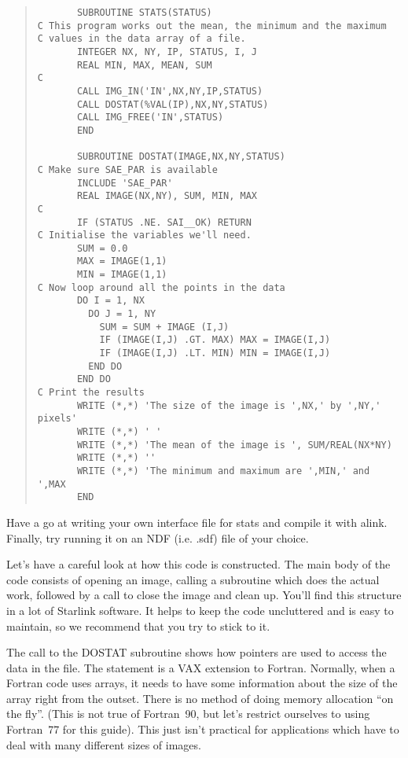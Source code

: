 \begin{quote}
{\small
\begin{verbatim}
       SUBROUTINE STATS(STATUS)
C This program works out the mean, the minimum and the maximum
C values in the data array of a file.
       INTEGER NX, NY, IP, STATUS, I, J
       REAL MIN, MAX, MEAN, SUM
C       
       CALL IMG_IN('IN',NX,NY,IP,STATUS)
       CALL DOSTAT(%VAL(IP),NX,NY,STATUS)
       CALL IMG_FREE('IN',STATUS)
       END

       SUBROUTINE DOSTAT(IMAGE,NX,NY,STATUS)
C Make sure SAE_PAR is available
       INCLUDE 'SAE_PAR'
       REAL IMAGE(NX,NY), SUM, MIN, MAX
C
       IF (STATUS .NE. SAI__OK) RETURN
C Initialise the variables we'll need.
       SUM = 0.0
       MAX = IMAGE(1,1)
       MIN = IMAGE(1,1)
C Now loop around all the points in the data
       DO I = 1, NX
         DO J = 1, NY
           SUM = SUM + IMAGE (I,J)
           IF (IMAGE(I,J) .GT. MAX) MAX = IMAGE(I,J)
           IF (IMAGE(I,J) .LT. MIN) MIN = IMAGE(I,J)
         END DO
       END DO
C Print the results
       WRITE (*,*) 'The size of the image is ',NX,' by ',NY,' pixels'
       WRITE (*,*) ' '
       WRITE (*,*) 'The mean of the image is ', SUM/REAL(NX*NY) 
       WRITE (*,*) ''
       WRITE (*,*) 'The minimum and maximum are ',MIN,' and ',MAX
       END
\end{verbatim}
}
\end{quote}

Have a go at writing your own interface file for {\sf stats} and
compile it with {\sf alink}. Finally, try running it on an
NDF (i.e. .sdf) file of your choice.

Let's have a careful look at how this code is constructed. The main body
of the code consists of opening an image, calling a subroutine which does the
actual work, followed by a call to close the image and clean up. You'll
find this structure in a lot of Starlink software. It helps to keep the 
code uncluttered and is easy to maintain, so we recommend that
you try to stick to it.

The call to the {\sf DOSTAT} subroutine shows how pointers are used to
access the data in the file. The {} statement is a VAX
extension to Fortran.  Normally, when a Fortran code uses arrays, it needs
to have some information about the size of the array right from the outset.
There is no method of doing memory allocation ``on the fly''. (This is not
true of Fortran~90, but let's restrict ourselves to using Fortran~77 for
this guide). This just isn't practical for applications which have to deal
with many different sizes of images. 
 

